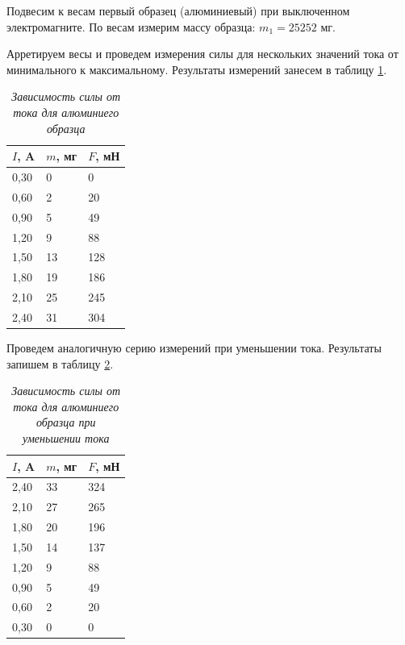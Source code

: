 \documentclass[a4paper,12pt]{article}
\begin{document}
Подвесим к весам первый образец (алюминиевый) при выключенном электромагните. По весам измерим массу образца: $m_1 = 25252$ мг.

Арретируем весы и проведем измерения силы для нескольких значений тока от минимального к максимальному. Результаты измерений занесем в таблицу \ref{table:1}.

\begin{table}[!ht]
    \centering
    \begin{tabular}{|l|l|l|}
    \hline
        $I$, A & $m$, мг & $F$, мН \\ \hline
        0,30 & 0 & 0 \\ \hline
        0,60 & 2 & 20 \\ \hline
        0,90 & 5 & 49 \\ \hline
        1,20 & 9 & 88 \\ \hline
        1,50 & 13 & 128 \\ \hline
        1,80 & 19 & 186 \\ \hline
        2,10 & 25 & 245 \\ \hline
        2,40 & 31 & 304 \\ \hline
    \end{tabular}\caption{\textit{Зависимость силы от тока для алюминиего образца}}\label{table:1}
\end{table}

Проведем аналогичную серию измерений при уменьшении тока. Результаты запишем в таблицу \ref{table:2}.

\begin{table}[!ht]
    \centering
    \begin{tabular}{|l|l|l|}
    \hline
        $I$, A & $m$, мг & $F$, мН \\ \hline
        2,40 & 33 & 324 \\ \hline
        2,10 & 27 & 265 \\ \hline
        1,80 & 20 & 196 \\ \hline
        1,50 & 14 & 137 \\ \hline
        1,20 & 9 & 88 \\ \hline
        0,90 & 5 & 49 \\ \hline
        0,60 & 2 & 20 \\ \hline
        0,30 & 0 & 0 \\ \hline
    \end{tabular}\caption{\textit{Зависимость силы от тока для алюминиего образца при уменьшении тока}}\label{table:2}
\end{table}
\end{document}
